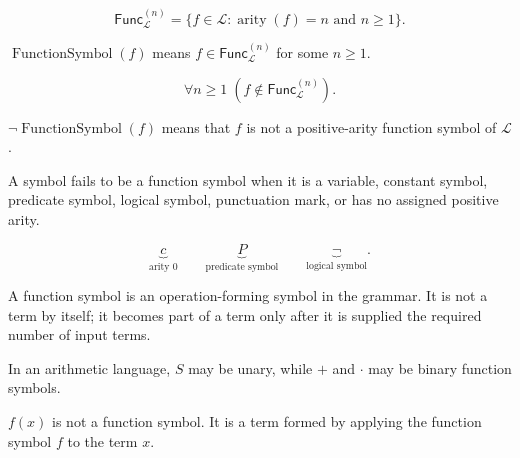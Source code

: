 \begin{remark*}
\[
\mathsf{Func}_{\mathcal L}^{(n)}
=
\{f\in\mathcal L : \operatorname{arity}(f)=n\text{ and }n\geq 1\}.
\]
\end{remark*}

\begin{remark*}
\(\operatorname{FunctionSymbol}(f)\) means
\(f\in\mathsf{Func}_{\mathcal L}^{(n)}\) for some \(n\geq 1\).
\end{remark*}

\begin{remark*}
\[
\forall n\geq 1\;(f\notin\mathsf{Func}_{\mathcal L}^{(n)}).
\]
\end{remark*}

\begin{remark*}
\(\neg\operatorname{FunctionSymbol}(f)\) means that \(f\) is not a positive-arity
function symbol of \(\mathcal L\).
\end{remark*}

\begin{remark*}
A symbol fails to be a function symbol when it is a variable, constant symbol,
predicate symbol, logical symbol, punctuation mark, or has no assigned positive
arity.
\end{remark*}

\begin{remark*}
\[
\underbrace{c}_{\text{arity }0}
\qquad
\underbrace{P}_{\text{predicate symbol}}
\qquad
\underbrace{\neg}_{\text{logical symbol}}.
\]
\end{remark*}

\begin{remark*}[Interpretation]
A function symbol is an operation-forming symbol in the grammar. It is not a
term by itself; it becomes part of a term only after it is supplied the required
number of input terms.
\end{remark*}

\begin{remark*}[Examples]
In an arithmetic language, \(S\) may be unary, while \(+\) and \(\cdot\) may be
binary function symbols.
\end{remark*}

\begin{remark*}
\(f(x)\) is not a function symbol. It is a term formed by applying the function
symbol \(f\) to the term \(x\).
\end{remark*}

